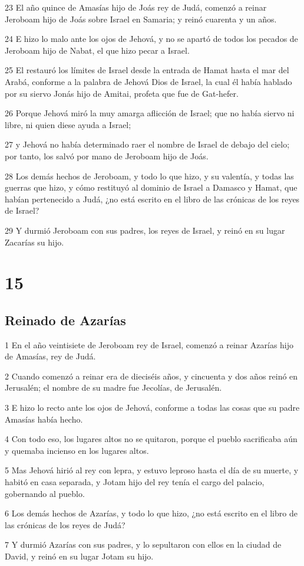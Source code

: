 \par 23 El año quince de Amasías hijo de Joás rey de Judá, comenzó a reinar Jeroboam hijo de Joás sobre Israel en Samaria; y reinó cuarenta y un años.
\par 24 E hizo lo malo ante los ojos de Jehová, y no se apartó de todos los pecados de Jeroboam hijo de Nabat, el que hizo pecar a Israel.
\par 25 El restauró los límites de Israel desde la entrada de Hamat hasta el mar del Arabá, conforme a la palabra de Jehová Dios de Israel, la cual él había hablado por su siervo Jonás hijo de Amitai, profeta que fue de Gat-hefer.
\par 26 Porque Jehová miró la muy amarga aflicción de Israel; que no había siervo ni libre, ni quien diese ayuda a Israel;
\par 27 y Jehová no había determinado raer el nombre de Israel de debajo del cielo; por tanto, los salvó por mano de Jeroboam hijo de Joás.
\par 28 Los demás hechos de Jeroboam, y todo lo que hizo, y su valentía, y todas las guerras que hizo, y cómo restituyó al dominio de Israel a Damasco y Hamat, que habían pertenecido a Judá, ¿no está escrito en el libro de las crónicas de los reyes de Israel?
\par 29 Y durmió Jeroboam con sus padres, los reyes de Israel, y reinó en su lugar Zacarías su hijo.

\chapter{15}

\section*{Reinado de Azarías}

\par 1 En el año veintisiete de Jeroboam rey de Israel, comenzó a reinar Azarías hijo de Amasías, rey de Judá.
\par 2 Cuando comenzó a reinar era de dieciséis años, y cincuenta y dos años reinó en Jerusalén; el nombre de su madre fue Jecolías, de Jerusalén.
\par 3 E hizo lo recto ante los ojos de Jehová, conforme a todas las cosas que su padre Amasías había hecho.
\par 4 Con todo eso, los lugares altos no se quitaron, porque el pueblo sacrificaba aún y quemaba incienso en los lugares altos.
\par 5 Mas Jehová hirió al rey con lepra, y estuvo leproso hasta el día de su muerte, y habitó en casa separada, y Jotam hijo del rey tenía el cargo del palacio, gobernando al pueblo.
\par 6 Los demás hechos de Azarías, y todo lo que hizo, ¿no está escrito en el libro de las crónicas de los reyes de Judá?
\par 7 Y durmió Azarías con sus padres, y lo sepultaron con ellos en la ciudad de David, y reinó en su lugar Jotam su hijo.

